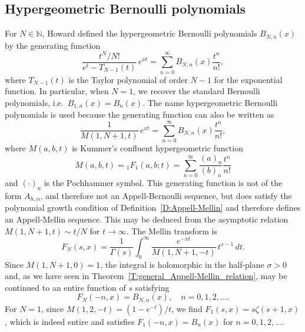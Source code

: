 \documentclass[11pt,a4paper]{amsart}
\newcommand{\N}{\mathbb{N}}
\theoremstyle{plain}
\theoremstyle{plain}
\theoremstyle{definition}
\theoremstyle{remark}
\begin{document}
\subsection{Hypergeometric Bernoulli polynomials} 


For $N \in \N$, Howard \cite{Ho1, Ho2} defined the hypergeometric Bernoulli polynomials $B_{N,n}(x)$ by the generating function
\[
  \frac{t^N/N!}{e^t-T_{N-1}(t)}\,e^{xt} = \sum_{n=0}^{\infty} B_{N,n}(x) \frac{t^n}{n!},
\]
where $T_{N-1}(t)$ is the Taylor polynomial of order $N-1$ for the exponential function. In particular, when $N=1$, we recover the standard Bernoulli polynomials, i.e.\ $B_{1,n}(x) = B_{n}(x)$. The name hypergeometric Bernoulli polynomials is used because the generating function can also be written as
\[
  \frac{1}{M(1,N+1,t)}\,e^{xt} = \sum_{n=0}^{\infty} B_{N,n}(x) \frac{t^n}{n!},
\]
where $M(a,b,t)$ is Kummer's confluent hypergeometric function
\[
  M(a,b,t) = {}_1F_1(a,b;t) = \sum_{n=0}^{\infty} \frac{(a)_{n}}{(b)_{n}} \frac{t^n}{n!}
\]
and $(\cdot)_{n}$ is the Pochhammer symbol.
This generating function is not of the form $A_{h,\alpha}$, and therefore not an Appell-Bernoulli sequence, but does satisfy the polynomial growth condition of Definition~\ref{D:Appell-Mellin} and therefore defines an Appell-Mellin sequence. This may be deduced from the asymptotic relation $M(1,N+1,t) \sim t/N$ for $t \to \infty$. The Mellin transform is
\begin{equation*}
  F_{N}(s,x) = \frac{1}{\Gamma(s)} \int_{0}^{\infty} \frac{e^{-xt}}{M(1,N+1,-t)}\, t^{s-1}\,dt.
\end{equation*}
Since $M(1,N+1,0) = 1$, the integral is holomorphic in the half-plane $\sigma>0$ and, as we have seen in Theorem~\ref{T:general_Appell-Mellin_relation}, may be continued to an entire function of $s$ satisfying
\begin{equation*}
	F_{N}(-n,x) = B_{N,n}(x),\quad n=0,1,2,\dots.
\end{equation*}
For $N=1$, since $M(1,2,-t) = (1-e^{-t})/t$, we find $F_{1}(s,x) = s \zeta(s+1,x)$, which is indeed entire and satisfies $F_{1}(-n,x) = B_{n}(x)$ for $n=0,1,2,\dots$.
\end{document}
